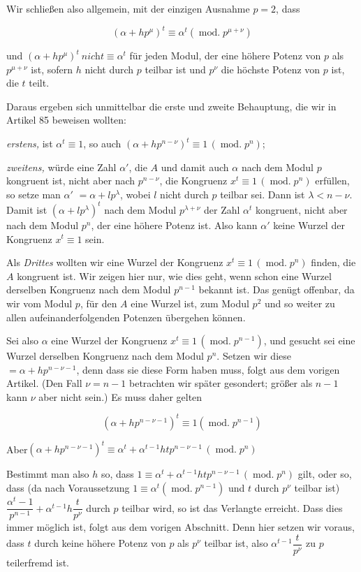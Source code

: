 Wir schließen also allgemein, mit der einzigen Ausnahme $p=2$, dass

\[(\alpha+hp^{\mu})^t\equiv\alpha^t(\operatorname{mod.}p^{\mu+\nu})\]

\noindent und $(\alpha+hp^{\mu})^t\ \textit{nicht}\equiv\alpha^t$ für jeden Modul, der eine höhere Potenz von $p$ als $p^{\mu+\nu}$ ist, sofern $h$ nicht durch $p$ teilbar ist und $p^{\nu}$ die höchste Potenz von $p$ ist, die $t$ teilt.

Daraus ergeben sich unmittelbar die erste und zweite Behauptung, die wir in Artikel 85 beweisen wollten:

\emph{erstens,} ist $\alpha^t\equiv1$, so auch $(\alpha+hp^{n-\nu})^t\equiv1\,(\operatorname{mod.}p^n)$;

\emph{zweitens,} würde eine Zahl $\alpha'$, die $A$ und damit auch $\alpha$ nach dem Modul $p$ kongruent ist, nicht aber nach $p^{n-\nu}$, die Kongruenz $x^t\equiv1\,(\operatorname{mod.}p^n)$ erfüllen, so setze man $\alpha'$ $=\alpha+lp^{\lambda}$, wobei $l$ nicht durch $p$ teilbar sei. Dann ist $\lambda<n-\nu$. Damit ist $(\alpha+lp^{\lambda})^t$ nach dem Modul $p^{\lambda+\nu}$ der Zahl $\alpha^t$ kongruent, nicht aber nach dem Modul $p^n$, der eine höhere Potenz ist. Also kann $\alpha'$ keine Wurzel der Kongruenz $x^t\equiv1$ sein.

Als \emph{Drittes} wollten wir eine Wurzel der Kongruenz $x^t\equiv1\,(\operatorname{mod.}p^n)$ finden, die $A$ kongruent ist. Wir zeigen hier nur, wie dies geht, wenn schon eine Wurzel derselben Kongruenz nach dem Modul $p^{n-1}$ bekannt ist. Das genügt offenbar, da wir vom Modul $p$, für den $A$ eine Wurzel ist, zum Modul $p^2$ und so weiter zu allen aufeinanderfolgenden Potenzen übergehen können.

Sei also $\alpha$ eine Wurzel der Kongruenz $x^t\equiv1\,(\operatorname{mod.}p^{n-1})$, und gesucht sei eine Wurzel derselben Kongruenz nach dem Modul $p^n$. Setzen wir diese $=\alpha+hp^{n-\nu-1}$, denn dass sie diese Form haben muss, folgt aus dem vorigen Artikel. (Den Fall $\nu=n-1$
betrachten wir später gesondert; größer als $n-1$ kann $\nu$ aber nicht sein.) Es muss daher gelten

\[(\alpha+hp^{n-\nu-1})^t\equiv1(\operatorname{mod.}p^{n-1})\]

\noindent Aber\hfill $(\alpha+hp^{n-\nu-1})^t\equiv\alpha^t+\alpha^{t-1}htp^{n-\nu-1}\,(\operatorname{mod.}p^n)$\hfill\mbox{}

\noindent Bestimmt man also $h$ so, dass $1\equiv\alpha^t+\alpha^{t-1}htp^{n-\nu-1}\,(\operatorname{mod.}p^n)$ gilt, oder so, dass (da nach Voraussetzung $1\equiv\alpha^t(\operatorname{mod.}p^{n-1})$ und $t$ durch $p^{\nu}$ teilbar ist) $\dfrac{\alpha^t-1}{p^{n-1}}+\alpha^{t-1}h\dfrac{t}{p^{\nu}}$ durch $p$ teilbar wird, so ist das Verlangte erreicht. Dass dies immer möglich ist, folgt aus dem vorigen Abschnitt. Denn hier setzen wir voraus, dass $t$ durch keine höhere Potenz von $p$ als $p^{\nu}$ teilbar ist, also $\alpha^{t-1}\dfrac{t}{p^{\nu}}$ zu $p$ teilerfremd ist.

